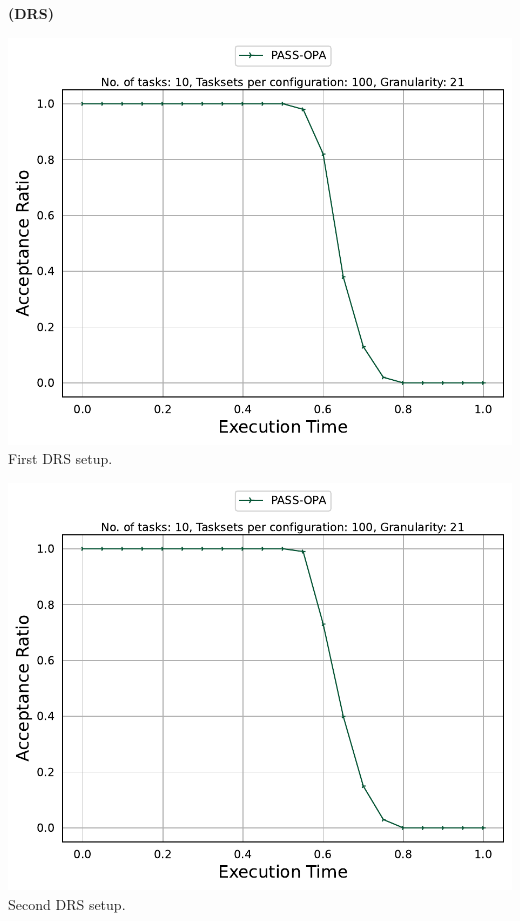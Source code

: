 \documentclass[]{article}
\begin{document}
	\begin{minipage}[t]{0.48\linewidth}
		\centering
		\textbf{(DRS)}
		\vspace{0.3cm}
		
		\includegraphics[width=\linewidth]{PASS-OPA[21][0.01-0.1][10].pdf}
		First DRS setup.
		\vspace{0.3cm}
		
		\includegraphics[width=\linewidth]{PASS-OPA_2nd[21][0.01-0.1][10].pdf}
		Second DRS setup.
		\vspace{0.3cm}
		

\end{minipage}
\end{document}
